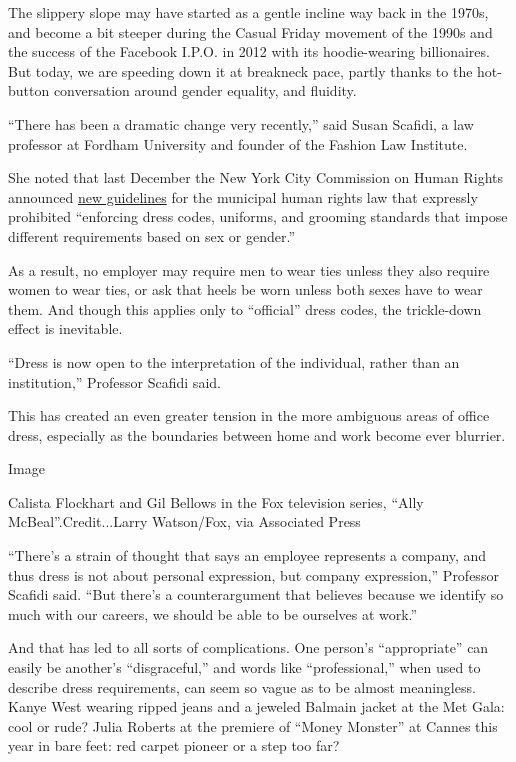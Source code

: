 The slippery slope may have started as a gentle incline way back in the
1970s, and become a bit steeper during the Casual Friday movement of the
1990s and the success of the Facebook I.P.O. in 2012 with its
hoodie-wearing billionaires. But today, we are speeding down it at
breakneck pace, partly thanks to the hot-button conversation around
gender equality, and fluidity.

``There has been a dramatic change very recently,'' said Susan Scafidi,
a law professor at Fordham University and founder of the Fashion Law
Institute.

She noted that last December the New York City Commission on Human
Rights announced
\href{http://www1.nyc.gov/office-of-the-mayor/news/961-15/nyc-commission-human-rights-strong-protections-city-s-transgender-gender}{new
guidelines} for the municipal human rights law that expressly prohibited
``enforcing dress codes, uniforms, and grooming standards that impose
different requirements based on sex or gender.''

As a result, no employer may require men to wear ties unless they also
require women to wear ties, or ask that heels be worn unless both sexes
have to wear them. And though this applies only to ``official'' dress
codes, the trickle-down effect is inevitable.

``Dress is now open to the interpretation of the individual, rather than
an institution,'' Professor Scafidi said.

This has created an even greater tension in the more ambiguous areas of
office dress, especially as the boundaries between home and work become
ever blurrier.

Image

Calista Flockhart and Gil Bellows in the Fox television series, ``Ally
McBeal''.Credit...Larry Watson/Fox, via Associated Press

``There's a strain of thought that says an employee represents a
company, and thus dress is not about personal expression, but company
expression,'' Professor Scafidi said. ``But there's a counterargument
that believes because we identify so much with our careers, we should be
able to be ourselves at work.''

And that has led to all sorts of complications. One person's
``appropriate'' can easily be another's ``disgraceful,'' and words like
``professional,'' when used to describe dress requirements, can seem so
vague as to be almost meaningless. Kanye West wearing ripped jeans and a
jeweled Balmain jacket at the Met Gala: cool or rude? Julia Roberts at
the premiere of ``Money Monster'' at Cannes this year in bare feet: red
carpet pioneer or a step too far?

